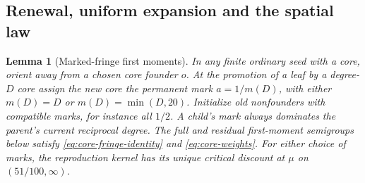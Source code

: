 \documentclass[11pt]{article}
\newtheorem{lemma}{Lemma}[section]
\theoremstyle{remark}
\numberwithin{equation}{section}
\begin{document}
\subsection{Renewal, uniform expansion and the spatial law}
\begin{lemma}[Marked-fringe first moments]\label{lem:core-renewal}
In any finite ordinary seed with a core, orient away from a chosen core founder $o$. At the promotion of a leaf by a degree-$D$ core assign the new core the permanent mark $a=1/m(D)$, with either $m(D)=D$ or $m(D)=\min(D,20)$. Initialize old nonfounders with compatible marks, for instance all $1/2$. A child's mark always dominates the parent's current reciprocal degree. The full and residual first-moment semigroups below satisfy \eqref{eq:core-fringe-identity} and \eqref{eq:core-weights}. For either choice of marks, the reproduction kernel has its unique critical discount at $\mu$ on $(51/100,\infty)$.
\end{lemma}
\end{document}
